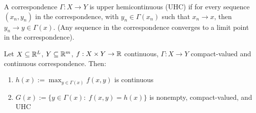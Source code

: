 \begin{definition}[UHC]
  A correspondence $\Gamma:X \to Y$ is upper hemicontinuous (UHC) if
  for every sequence $(x_n, y_n)$ in the correspondence, with $y_n \in
  \Gamma(x_n)$ such that $x_n \to x$, then $y_n \to y \in
  \Gamma(x)$. (Any sequence in the correspondence converges to a limit
  point in the correspondence).
\end{definition}

\begin{theorem}
  Let $X \subseteq {\mathbb R}^L$, $Y \subseteq {\mathbb R}^m$, $f : X \times Y \to {\mathbb R}$
  continuous, $\Gamma : X \to Y$ compact-valued and continuous
  correspondence. Then:
  \begin{enumerate}[(1)]
  \item $h(x) := \max_{y\in \Gamma(x)}f(x,y)$ is continuous
  \item $G(x) := \{y \in \Gamma(x): \; f(x,y) = h(x)\}$ is nonempty,
    compact-valued, and UHC
  \end{enumerate}
\end{theorem}
